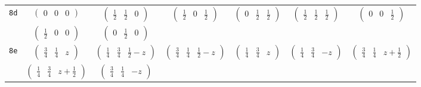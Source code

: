 \documentclass[fleqn,9pt,landscape]{jsarticle}
\begin{document}
\begin{center}
\begin{longtable}{ccccccc}
{\tt 8d} & $ \begin{pmatrix} 0 & 0 & 0 \end{pmatrix} $ & $ \begin{pmatrix} \frac{1}{2} & \frac{1}{2} & 0 \end{pmatrix} $ & $ \begin{pmatrix} \frac{1}{2} & 0 & \frac{1}{2} \end{pmatrix} $ & $ \begin{pmatrix} 0 & \frac{1}{2} & \frac{1}{2} \end{pmatrix} $ & $ \begin{pmatrix} \frac{1}{2} & \frac{1}{2} & \frac{1}{2} \end{pmatrix} $ & $ \begin{pmatrix} 0 & 0 & \frac{1}{2} \end{pmatrix} $ \\
& $ \begin{pmatrix} \frac{1}{2} & 0 & 0 \end{pmatrix} $ & $ \begin{pmatrix} 0 & \frac{1}{2} & 0 \end{pmatrix} $ & $  $ & $  $ & $  $ & $  $ \\ \hline
{\tt 8e} & $ \begin{pmatrix} \frac{3}{4} & \frac{1}{4} & z \end{pmatrix} $ & $ \begin{pmatrix} \frac{1}{4} & \frac{3}{4} & \frac{1}{2} - z \end{pmatrix} $ & $ \begin{pmatrix} \frac{3}{4} & \frac{1}{4} & \frac{1}{2} - z \end{pmatrix} $ & $ \begin{pmatrix} \frac{1}{4} & \frac{3}{4} & z \end{pmatrix} $ & $ \begin{pmatrix} \frac{1}{4} & \frac{3}{4} & - z \end{pmatrix} $ & $ \begin{pmatrix} \frac{3}{4} & \frac{1}{4} & z + \frac{1}{2} \end{pmatrix} $ \\
& $ \begin{pmatrix} \frac{1}{4} & \frac{3}{4} & z + \frac{1}{2} \end{pmatrix} $ & $ \begin{pmatrix} \frac{3}{4} & \frac{1}{4} & - z \end{pmatrix} $ & $  $ & $  $ & $  $ & $  $ \\ \hline

\end{longtable}
\end{center}
\end{document}
